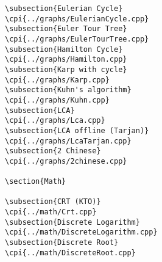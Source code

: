 {\begin{verbatim}
\subsection{Eulerian Cycle}
\cpi{../graphs/EulerianCycle.cpp}
\subsection{Euler Tour Tree}
\cpi{../graphs/EulerTourTree.cpp}
\subsection{Hamilton Cycle}
\cpi{../graphs/Hamilton.cpp}
\subsection{Karp with cycle}
\cpi{../graphs/Karp.cpp}
\subsection{Kuhn's algorithm}
\cpi{../graphs/Kuhn.cpp}
\subsection{LCA}
\cpi{../graphs/Lca.cpp}
\subsection{LCA offline (Tarjan)}
\cpi{../graphs/LcaTarjan.cpp}
\subsection{2 Chinese}
\cpi{../graphs/2chinese.cpp}

\section{Math}

\subsection{CRT (KTO)}
\cpi{../math/Crt.cpp}
\subsection{Discrete Logarithm}
\cpi{../math/DiscreteLogarithm.cpp}
\subsection{Discrete Root}
\cpi{../math/DiscreteRoot.cpp}

\end{verbatim}}
